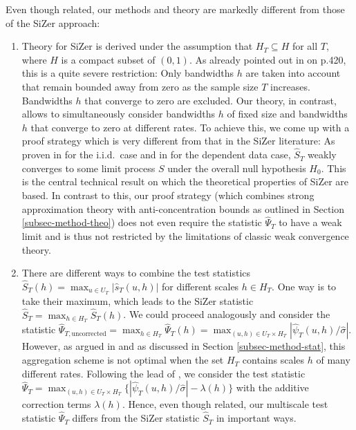 Even though related, our methods and theory are markedly different from those of the SiZer approach:
\begin{enumerate}[label=(\roman*), leftmargin=0.75cm]

\item Theory for SiZer is derived under the assumption that $H_T \subseteq H$ for all $T$, where $H$ is a compact subset of $(0,1)$. As already pointed out in \cite{ChaudhuriMarron2000} on p.420, this is a quite severe restriction: Only bandwidths $h$ are taken into account that remain bounded away from zero as the sample size $T$ increases. Bandwidths $h$ that converge to zero are excluded. Our theory, in contrast, allows to simultaneously consider bandwidths $h$ of fixed size and bandwidths $h$ that converge to zero at different rates. To achieve this, we come up with a proof strategy which is very different from that in the SiZer literature:  As proven in \cite{ChaudhuriMarron2000} for the i.i.d.\ case and in \cite{ParkHannigKang2009} for the dependent data case, $\widehat{S}_T$ weakly converges to some limit process $S$ under the overall null hypothesis $H_0$. This is the central technical result on which the theoretical properties of SiZer are based. In contrast to this, our proof strategy (which combines strong approximation theory with anti-concentration bounds as outlined in Section \ref{subsec-method-theo}) does not even require the statistic $\widehat{\Psi}_T$ to have a weak limit and is thus not restricted by the limitations of classic weak convergence theory. 

\item There are different ways to combine the test statistics $\widehat{S}_T(h) = \max_{u \in U_T} |\widehat{s}_T(u,h)|$ for different scales $h \in H_T$. One way is to take their maximum, which leads to the SiZer statistic $\widehat{S}_T = \max_{h \in H_T} \widehat{S}_T(h)$. We could proceed analogously and consider the statistic $\widehat{\Psi}_{T,\text{uncorrected}} = \max_{h \in H_T} \widehat{\Psi}_T(h) = \max_{(u,h) \in U_T \times H_T} |\widehat{\psi}_T(u,h)/\widehat{\sigma}|$. However, as argued in \cite{DuembgenSpokoiny2001} and as discussed in Section \ref{subsec-method-stat}, this aggregation scheme is not optimal when the set $H_T$ contains scales $h$ of many different rates. Following the lead of \cite{DuembgenSpokoiny2001}, we consider the test statistic $\widehat{\Psi}_T = \max_{(u,h) \in U_T \times H_T} \{ |\widehat{\psi}_T(u,h)/\widehat{\sigma}| - \lambda(h) \}$ with the additive correction terms $\lambda(h)$. Hence, even though related, our multiscale test statistic $\widehat{\Psi}_T$ differs from the SiZer statistic $\widehat{S}_T$ in important ways. 


\end{enumerate}
